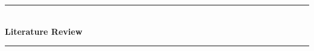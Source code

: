 \documentclass[12pt]{article} %
\begin{document}

\begin{titlepage}

\newcommand{\HRule}{\rule{\linewidth}{0.5mm}} %

\center %

\HRule \\[0.4cm]
{ \fontsize{20pt}{20pt} \bfseries Literature Review}\\[0.4cm] %
\HRule \\[1.5cm]

\begin{minipage}{0.4\textwidth}
     \\ 
    \vspace{2em}
\end{minipage}

\end{titlepage}








\end{document}
